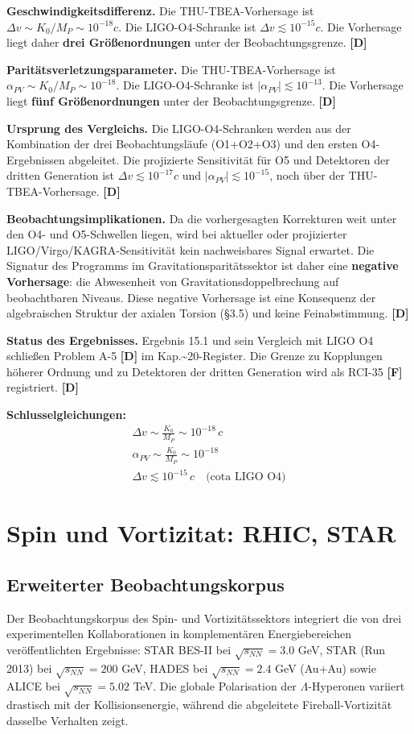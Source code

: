 ﻿\documentclass[11pt,letterpaper]{article}
\begin{document}
\textbf{Geschwindigkeitsdifferenz.} Die THU-TBEA-Vorhersage ist $\Delta v \sim K_0/M_P \sim 10^{-18}c$. Die LIGO-O4-Schranke ist $\Delta v \lesssim 10^{-15}c$. Die Vorhersage liegt daher \textbf{drei Größenordnungen} unter der Beobachtungsgrenze. \textbf{[D]}

\textbf{Paritätsverletzungsparameter.} Die THU-TBEA-Vorhersage ist $\alpha_{PV} \sim K_0/M_P \sim 10^{-18}$. Die LIGO-O4-Schranke ist $|\alpha_{PV}| \lesssim 10^{-13}$. Die Vorhersage liegt \textbf{fünf Größenordnungen} unter der Beobachtungsgrenze. \textbf{[D]}

\textbf{Ursprung des Vergleichs.} Die LIGO-O4-Schranken werden aus der Kombination der drei Beobachtungsläufe (O1+O2+O3) und den ersten O4-Ergebnissen abgeleitet. Die projizierte Sensitivität für O5 und Detektoren der dritten Generation ist $\Delta v \lesssim 10^{-17}c$ und $|\alpha_{PV}| \lesssim 10^{-15}$, noch über der THU-TBEA-Vorhersage. \textbf{[D]}

\textbf{Beobachtungsimplikationen.} Da die vorhergesagten Korrekturen weit unter den O4- und O5-Schwellen liegen, wird bei aktueller oder projizierter LIGO/Virgo/KAGRA-Sensitivität kein nachweisbares Signal erwartet. Die Signatur des Programms im Gravitationsparitätssektor ist daher eine \textbf{negative Vorhersage}: die Abwesenheit von Gravitationsdoppelbrechung auf beobachtbaren Niveaus. Diese negative Vorhersage ist eine Konsequenz der algebraischen Struktur der axialen Torsion (§3.5) und keine Feinabstimmung. \textbf{[D]}

\textbf{Status des Ergebnisses.} Ergebnis 15.1 und sein Vergleich mit LIGO O4 schließen Problem A-5 \textbf{[D]} im Kap.\textasciitilde{}20-Register. Die Grenze zu Kopplungen höherer Ordnung und zu Detektoren der dritten Generation wird als RCI-35 \textbf{[F]} registriert. \textbf{[D]}

\textbf{Schlusselgleichungen:}
\begin{align*}
    \Delta v \sim \frac{K_0}{M_P} \sim 10^{-18}\,c \\
    \alpha_{PV} \sim \frac{K_0}{M_P} \sim 10^{-18} \\
    \Delta v \lesssim 10^{-15}\,c \quad \text{(cota LIGO O4)}
\end{align*}
\section{Spin und Vortizitat: RHIC, STAR}
\subsection{Erweiterter Beobachtungskorpus}
Der Beobachtungskorpus des Spin- und Vortizitätssektors integriert die von drei experimentellen Kollaborationen in komplementären Energiebereichen veröffentlichten Ergebnisse: STAR BES-II bei $\sqrt{s_{NN}} = 3.0$ GeV, STAR (Run 2013) bei $\sqrt{s_{NN}} = 200$ GeV, HADES bei $\sqrt{s_{NN}} = 2.4$ GeV (Au+Au) sowie ALICE bei $\sqrt{s_{NN}} = 5.02$ TeV. Die globale Polarisation der $\Lambda$-Hyperonen variiert drastisch mit der Kollisionsenergie, während die abgeleitete Fireball-Vortizität dasselbe Verhalten zeigt.
\end{document}

